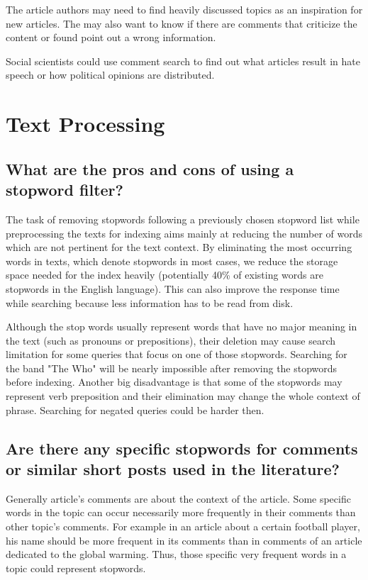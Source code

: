 \documentclass{scrartcl}
\begin{document}
The article authors may need to find heavily discussed topics as an inspiration for new articles. The may also want to know if there are comments that criticize the content or found point out a wrong information.

Social scientists could use comment search to find out what articles result in hate speech or how political opinions are distributed.


\section{Text Processing}

\subsection{What are the pros and cons of using a stopword filter? }

The task  of removing stopwords following a previously chosen stopword list while preprocessing the texts for indexing aims mainly at reducing the number of words which are not pertinent for the text context. By eliminating the most occurring words in texts, which denote stopwords in most cases, we reduce the storage space needed for the index heavily (potentially 40\% of existing words are stopwords in the English language). This can also improve the response time while searching because less information has to be read from disk.

Although the stop words usually represent words that have no major meaning in the text (such as pronouns or prepositions), their deletion may cause search limitation for some queries that focus on one of those stopwords. Searching for the band "The Who" will be nearly impossible after removing the stopwords before indexing. Another big disadvantage is that some of the stopwords may represent verb preposition and their elimination may change the whole context of phrase. Searching for negated queries could be harder then.

\subsection{Are there any specific stopwords for comments or similar short posts used in the literature?}

Generally article's comments are about the context of the article. Some specific words in the topic can occur necessarily more frequently in their comments than other topic's comments. For example in an article about a certain football player, his name should be more frequent in its comments than in comments of an article dedicated to the global warming. Thus, those specific very frequent words in a topic could represent stopwords.
\end{document}
